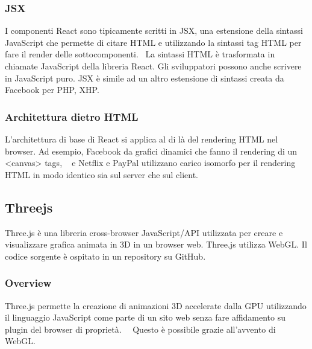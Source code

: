 \subsubsection{JSX}
I componenti React sono tipicamente scritti in JSX, una estensione della sintassi JavaScript che permette di citare
HTML e utilizzando la sintassi tag HTML per fare  il render delle sottocomponenti.~\cite{jsx}
La sintassi HTML è trasformata in chiamate JavaScript
della libreria React. Gli sviluppatori possono anche scrivere in JavaScript puro. JSX è simile ad un altro
estensione di sintassi creata da Facebook per PHP, XHP.

\subsubsection{Architettura dietro HTML}
L'architettura di base di React si applica al di là del rendering HTML nel browser. Ad esempio, Facebook
da grafici dinamici che fanno il rendering di un <canvas> tags, ~\cite{reactnative} e Netflix e PayPal utilizzano carico isomorfo per
il rendering HTML in modo identico sia sul server che sul client.~\cite{paypal}~\cite{netflix}


\newpage
\subsection{Threejs}
\label{sec:chapter_2_section_3_sub_2}
Three.js \`e una libreria cross-browser JavaScript/API utilizzata per creare e visualizzare grafica animata in 3D
in un browser web. Three.js utilizza WebGL. Il codice sorgente è ospitato in un repository su GitHub.

\subsubsection{Overview}
Three.js permette la creazione di animazioni 3D accelerate dalla GPU utilizzando il linguaggio JavaScript
come parte di un sito web senza fare affidamento su plugin del browser di proprietà.~\cite{O3D}~\cite{unity}
 Questo è possibile grazie all'avvento di WebGL.~\cite{khronos}

